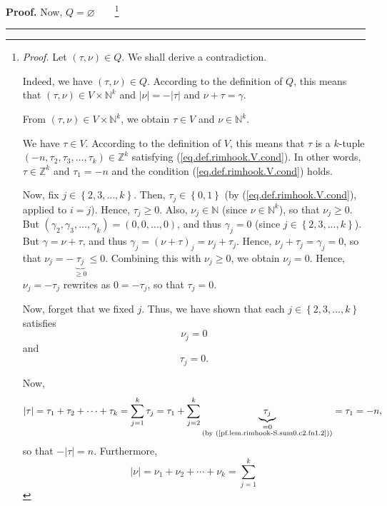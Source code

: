 \documentclass[numbers=enddot,12pt,final,onecolumn,notitlepage]{scrartcl}%
\theoremstyle{definition}
\newenvironment{proof}[1][Proof]{\noindent\textbf{#1.} }{\ \rule{0.5em}{0.5em}}
\let\sumnonlimits\sum
\renewcommand{\sum}{\sumnonlimits\limits}
\begin{document}
\begin{proof}
Now, $Q=\varnothing$\ \ \ \ \footnote{\textit{Proof.} Let $\left(  \tau
,\nu\right)  \in Q$. We shall derive a contradiction.
\par
Indeed, we have $\left(  \tau,\nu\right)  \in Q$. According to the definition
of $Q$, this means that $\left(  \tau,\nu\right)  \in V\times\mathbb{N}^{k}$
and $\left\vert \nu\right\vert =-\left\vert \tau\right\vert $ and $\nu
+\tau=\gamma$.
\par
From $\left(  \tau,\nu\right)  \in V\times\mathbb{N}^{k}$, we obtain $\tau\in
V$ and $\nu\in\mathbb{N}^{k}$.
\par
We have $\tau\in V$. According to the definition of $V$, this means that
$\tau$ is a $k$-tuple $\left(  -n,\tau_{2},\tau_{3},\ldots,\tau_{k}\right)
\in\mathbb{Z}^{k}$ satisfying (\ref{eq.def.rimhook.V.cond}). In other words,
$\tau\in\mathbb{Z}^{k}$ and $\tau_{1}=-n$ and the condition
(\ref{eq.def.rimhook.V.cond}) holds.
\par
Now, fix $j\in\left\{  2,3,\ldots,k\right\}  $. Then, $\tau_{j}\in\left\{
0,1\right\}  $ (by (\ref{eq.def.rimhook.V.cond}), applied to $i=j$). Hence,
$\tau_{j}\geq0$. Also, $\nu_{j}\in\mathbb{N}$ (since $\nu\in\mathbb{N}^{k}$),
so that $\nu_{j}\geq0$. But $\left(  \gamma_{2},\gamma_{3},\ldots,\gamma
_{k}\right)  =\left(  0,0,\ldots,0\right)  $, and thus $\gamma_{j}=0$ (since
$j\in\left\{  2,3,\ldots,k\right\}  $). But $\gamma=\nu+\tau$, and thus
$\gamma_{j}=\left(  \nu+\tau\right)  _{j}=\nu_{j}+\tau_{j}$. Hence, $\nu
_{j}+\tau_{j}=\gamma_{j}=0$, so that $\nu_{j}=-\underbrace{\tau_{j}}_{\geq
0}\leq0$. Combining this with $\nu_{j}\geq0$, we obtain $\nu_{j}=0$. Hence,
$\nu_{j}=-\tau_{j}$ rewrites as $0=-\tau_{j}$, so that $\tau_{j}=0$.
\par
Now, forget that we fixed $j$. Thus, we have shown that each $j\in\left\{
2,3,\ldots,k\right\}  $ satisfies
\begin{equation}
\nu_{j}=0 \label{pf.lem.rimhook-S.sum0.c2.fn1.1}%
\end{equation}
and
\begin{equation}
\tau_{j}=0. \label{pf.lem.rimhook-S.sum0.c2.fn1.2}%
\end{equation}
\par
Now,%
\[
\left\vert \tau\right\vert =\tau_{1}+\tau_{2}+\cdots+\tau_{k}=\sum_{j=1}%
^{k}\tau_{j}=\tau_{1}+\sum_{j=2}^{k}\underbrace{\tau_{j}}%
_{\substack{=0\\\text{(by (\ref{pf.lem.rimhook-S.sum0.c2.fn1.2}))}}}=\tau
_{1}=-n,
\]
so that $-\left\vert \tau\right\vert =n$. Furthermore,%
\[
\left\vert \nu\right\vert =\nu_{1}+\nu_{2}+\cdots+\nu_{k}=\sum_{j=1}^{k}%
\]}
\end{proof}
\end{document}
